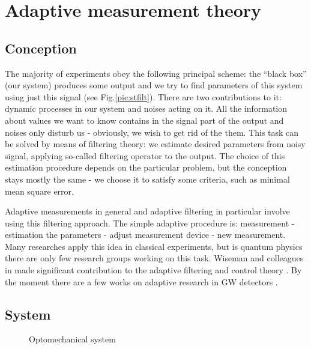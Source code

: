 \section{Adaptive measurement theory}\label{sec:th}
\subsection{Conception}
The majority of experiments obey the following principal scheme: the ``black box'' (our system) produces some output and we try to find parameters of this system using just this signal (see Fig.\ref{pic:stfilt}). There are two contributions to it: dynamic processes in our system and noises acting on it. 
All the information about values we want to know contains in the signal part of the output and noises only disturb us - obviously, we wish to get rid
of the them. This task can be solved by means of filtering theory: we estimate desired parameters from noisy signal, applying so-called filtering 
operator to the output. The choice of this estimation procedure depends on the particular problem, but the conception stays mostly the same - we choose
it to satisfy some criteria, such as minimal mean square error.

Adaptive measurements in general and adaptive filtering in particular involve using this filtering approach\cite{Wiseman2011a,Ahn2008}. The simple adaptive procedure is:
measurement - estimation the parameters - adjust measurement device - new measurement. Many researches apply this idea in classical experiments, but 
is quantum physics there are only few research groups working on this task\cite{Wiseman1997,Braginsky1993}. Wiseman and colleagues in made significant contribution to the adaptive filtering and
control theory \cite{Berry2008,Berry2001,Berry2002,Measurements1995m}. By the moment there are a few works on adaptive research in GW detectors \cite{Hentschel2010,Dhurandhar2008}.

\subsection{System}

\begin{figure}
\caption{Optomechanical system}
\label{scheme}
\end{figure}

